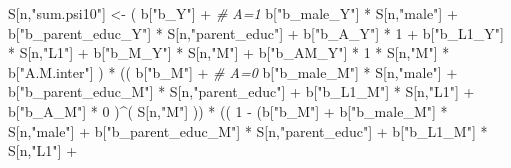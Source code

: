 \documentclass[
]{book}
\newenvironment{Shaded}{\begin{snugshade}}{\end{snugshade}}
\newcommand{\CommentTok}[1]{\textcolor[rgb]{0.56,0.35,0.01}{\textit{#1}}}
\newcommand{\DecValTok}[1]{\textcolor[rgb]{0.00,0.00,0.81}{#1}}
\newcommand{\NormalTok}[1]{#1}
\newcommand{\OtherTok}[1]{\textcolor[rgb]{0.56,0.35,0.01}{#1}}
\newcommand{\SpecialCharTok}[1]{\textcolor[rgb]{0.00,0.00,0.00}{#1}}
\newcommand{\StringTok}[1]{\textcolor[rgb]{0.31,0.60,0.02}{#1}}
\begin{document}
\begin{Shaded}
\begin{Highlighting}[]
\NormalTok{    S[n,}\StringTok{"sum.psi10"}\NormalTok{] }\OtherTok{\textless{}{-}}\NormalTok{  ( b[}\StringTok{"b\_Y"}\NormalTok{] }\SpecialCharTok{+}                                           \CommentTok{\# A=1}
\NormalTok{                             b[}\StringTok{"b\_male\_Y"}\NormalTok{] }\SpecialCharTok{*}\NormalTok{ S[n,}\StringTok{"male"}\NormalTok{] }\SpecialCharTok{+} 
\NormalTok{                             b[}\StringTok{"b\_parent\_educ\_Y"}\NormalTok{] }\SpecialCharTok{*}\NormalTok{ S[n,}\StringTok{"parent\_educ"}\NormalTok{] }\SpecialCharTok{+} 
\NormalTok{                             b[}\StringTok{"b\_A\_Y"}\NormalTok{] }\SpecialCharTok{*} \DecValTok{1} \SpecialCharTok{+} 
\NormalTok{                             b[}\StringTok{"b\_L1\_Y"}\NormalTok{] }\SpecialCharTok{*}\NormalTok{ S[n,}\StringTok{"L1"}\NormalTok{] }\SpecialCharTok{+}
\NormalTok{                             b[}\StringTok{"b\_M\_Y"}\NormalTok{] }\SpecialCharTok{*}\NormalTok{ S[n,}\StringTok{"M"}\NormalTok{] }\SpecialCharTok{+}
\NormalTok{                             b[}\StringTok{"b\_AM\_Y"}\NormalTok{] }\SpecialCharTok{*} \DecValTok{1} \SpecialCharTok{*}\NormalTok{ S[n,}\StringTok{"M"}\NormalTok{] }\SpecialCharTok{*}\NormalTok{ b[}\StringTok{"A.M.inter"}\NormalTok{] ) }\SpecialCharTok{*}
\NormalTok{      (( b[}\StringTok{"b\_M"}\NormalTok{] }\SpecialCharTok{+}                                                             \CommentTok{\# A\textquotesingle{}=0}
\NormalTok{           b[}\StringTok{"b\_male\_M"}\NormalTok{] }\SpecialCharTok{*}\NormalTok{ S[n,}\StringTok{"male"}\NormalTok{] }\SpecialCharTok{+} 
\NormalTok{           b[}\StringTok{"b\_parent\_educ\_M"}\NormalTok{] }\SpecialCharTok{*}\NormalTok{ S[n,}\StringTok{"parent\_educ"}\NormalTok{] }\SpecialCharTok{+} 
\NormalTok{           b[}\StringTok{"b\_L1\_M"}\NormalTok{] }\SpecialCharTok{*}\NormalTok{ S[n,}\StringTok{"L1"}\NormalTok{] }\SpecialCharTok{+}
\NormalTok{           b[}\StringTok{"b\_A\_M"}\NormalTok{] }\SpecialCharTok{*} \DecValTok{0}\NormalTok{ )}\SpecialCharTok{\^{}}\NormalTok{( S[n,}\StringTok{"M"}\NormalTok{] )) }\SpecialCharTok{*}
\NormalTok{      (( }\DecValTok{1} \SpecialCharTok{{-}}\NormalTok{ (b[}\StringTok{"b\_M"}\NormalTok{] }\SpecialCharTok{+} 
\NormalTok{                b[}\StringTok{"b\_male\_M"}\NormalTok{] }\SpecialCharTok{*}\NormalTok{ S[n,}\StringTok{"male"}\NormalTok{] }\SpecialCharTok{+} 
\NormalTok{                b[}\StringTok{"b\_parent\_educ\_M"}\NormalTok{] }\SpecialCharTok{*}\NormalTok{ S[n,}\StringTok{"parent\_educ"}\NormalTok{] }\SpecialCharTok{+} 
\NormalTok{                b[}\StringTok{"b\_L1\_M"}\NormalTok{] }\SpecialCharTok{*}\NormalTok{ S[n,}\StringTok{"L1"}\NormalTok{] }\SpecialCharTok{+}

\end{Highlighting}
\end{Shaded}
\end{document}
